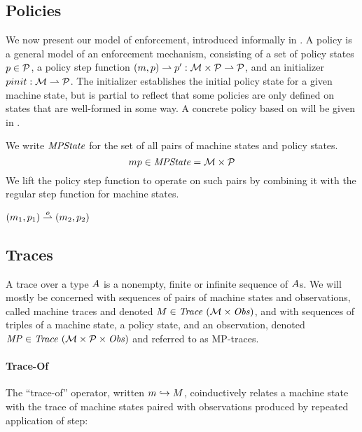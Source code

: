 \documentclass[acmsmall,review,anonymous]{acmart}\settopmatter{printfolios=true,printccs=false,printacmref=false}
\begin{document}
\subsection{Policies}

We now present our model of enforcement, introduced informally in .
A policy is a general model of an enforcement mechanism, consisting of a
set of policy states \(p \in \mathcal{P}\), a policy step function
\((m, p) \rightharpoonup p' : {\mathcal M} \times \mathcal{P}
\rightharpoonup \mathcal{P}\), and an initializer \(pinit : {\mathcal M} \rightharpoonup
\mathcal{P}\). The initializer establishes the initial policy state for a given
machine state, but is partial to reflect that some policies are only defined
on states that are well-formed in some way.
%
%
A concrete policy based on \citet{DBLP:conf/sp/RoesslerD18} will be given in
.

We write $\mathit{MPState}$ for the set of all pairs of machine states and policy
states.
%
\[mp \in \mathit{MPState} = {\mathcal M} \times \mathcal{P}\]
%
We lift the policy step function to operate on such pairs
by combining it with the regular step function for machine states.

            {\((m_1,p_1) \overset{o}{\rightharpoonup}
               (m_2,p_2)\)}


\subsection{Traces}

A trace over a type $A$ is a nonempty, finite or infinite sequence of
$A$s. We will mostly be concerned with sequences of pairs of machine states
and observations, called machine traces and denoted $M \in \mathit{Trace}~({\mathcal M} \times \mathit{Obs})$,
and with sequences of triples of a machine state, a policy state, and an
observation, denoted $\mathit{MP} \in \mathit{Trace}~({\mathcal M} \times \mathcal{P} \times \mathit{Obs})$ and referred to as MP-traces.

\paragraph*{Trace-Of}

The ``trace-of'' operator, written \(m \hookrightarrow M\),
coinductively relates a machine state with the trace of machine states
paired with observations produced by repeated application of step:
\end{document}
